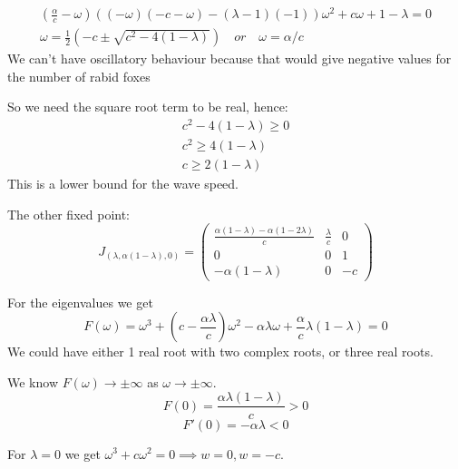 \documentclass{X:/Documents/Coding/Latex/myassignment}
\begin{document}
\begin{align*}
\left(\frac{\alpha}{c} - \omega\right)\left((- \omega) (-c- \omega) - (\lambda -1)(-1)\right)
\omega^2 + c \omega + 1 - \lambda = 0\\
\omega = \frac12 \left(-c \pm \sqrt{c^2 - 4(1- \lambda)}\right) \quad or \quad \omega = \alpha/c
\end{align*}
We can't have oscillatory behaviour because that would give negative values for the number of rabid foxes

So we need the square root term to be real, hence:
\begin{align*}
c^2 - 4(1- \lambda) \geq 0\\
c^2 \geq 4(1- \lambda)\\
c \geq 2(1- \lambda)
\end{align*}
This is a lower bound for the wave speed.

The other fixed point:
\[J_{(\lambda, \alpha(1- \lambda),0)} = \begin{pmatrix}
	\frac{\alpha(1- \lambda) - \alpha ( 1 - 2 \lambda)}{c}& \frac{\lambda}{c}&0\\
	0&0&1\\
	- \alpha(1- \lambda)& 0& -c 
\end{pmatrix}\]

For the eigenvalues we get
\[F(\omega) = \omega^3 + \left(c - \frac{\alpha \lambda}{c}\right)\omega^2 - \alpha \lambda \omega + \frac{\alpha}{c} \lambda (1 - \lambda) = 0\]
We could have either 1 real root with two complex roots, or three real roots.

We know $F(\omega) \to \pm \infty$ as $\omega \to \pm \infty$.
\[F(0) = \frac{\alpha \lambda (1 - \lambda)}{c}  > 0\]
\[F'(0) = -\alpha \lambda < 0 \]

For $\lambda = 0$ we get $\omega^3 + c \omega^2 = 0 \implies w=0,w = -c$. 
\end{document}
